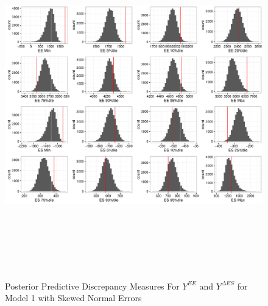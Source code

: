 \documentclass[11pt]{article}\usepackage[]{graphicx}\usepackage[]{color}
\begin{document}
  \begin{figure}
  \centering
  \includegraphics[width=17cm,height=15cm]{manual_figure/wpydiag1s.pdf}
  \caption{Posterior Predictive Discrepancy Measures For $Y^{EE}$ and $Y^{\Delta ES}$ for Model 1 with Skewed Normal Errors}
  \label{wpydiag1s}
  \end{figure}
\end{document}

